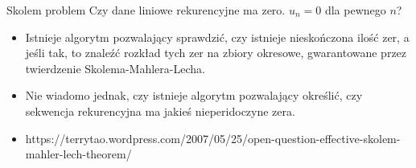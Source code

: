 \documentclass{beamer}
\theoremstyle{definition}
\begin{document}
\begin{frame}{Skolem problem}
    Czy dane liniowe rekurencyjne ma zero. 
    $u_n = 0$ dla pewnego $n$?
    \begin{itemize}
        \item Istnieje algorytm pozwalający sprawdzić, czy istnieje nieskończona ilość zer, a jeśli tak, to znaleźć rozkład tych zer na zbiory okresowe, gwarantowane przez twierdzenie Skolema-Mahlera-Lecha. 
        \item Nie wiadomo jednak, czy istnieje algorytm pozwalający określić, czy sekwencja rekurencyjna ma jakieś nieperidoczyne zera. 
    \end{itemize}
\end{frame}


\begin{frame}


\begin{itemize}
    \item https://terrytao.wordpress.com/2007/05/25/open-question-effective-skolem-mahler-lech-theorem/
\end{itemize}
\end{frame}
\end{document}
